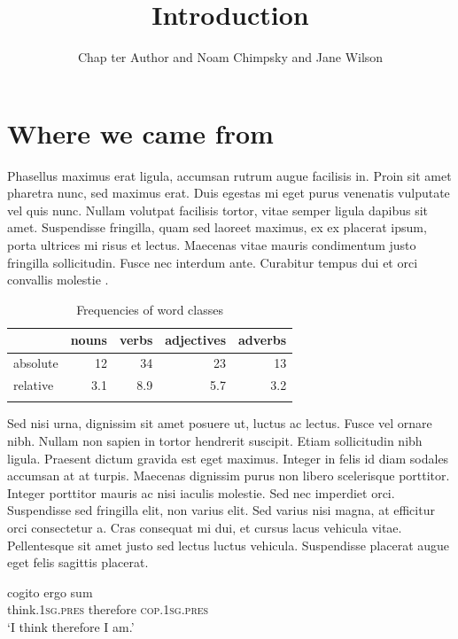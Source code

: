 \documentclass[output=paper,colorlinks,citecolor=brown
]{langscibook}
\author{Chap ter Author\orcid{}\affiliation{University of Eden} and
        Noam Chimpsky\orcid{}\affiliation{University of Pluto} and
        Jane Wilson\orcid{}\affiliation{National Institute for Language}}
\title{Introduction}
\begin{document}
\maketitle

\section{Where we came from}
Phasellus maximus erat ligula, accumsan rutrum augue facilisis in. Proin sit amet pharetra nunc, sed maximus erat. Duis egestas mi eget purus venenatis vulputate vel quis nunc. Nullam volutpat facilisis tortor, vitae semper ligula dapibus sit amet. Suspendisse fringilla, quam sed laoreet maximus, ex ex placerat ipsum, porta ultrices mi risus et lectus. Maecenas vitae mauris condimentum justo fringilla sollicitudin. Fusce nec interdum ante. Curabitur tempus dui et orci convallis molestie \citep{Chomsky1957}.

\begin{table}
\caption{Frequencies of word classes}
\label{tab:myname:frequencies}
 \begin{tabularx}{.8\textwidth}{X rrrr}
  \lsptoprule
            & nouns & verbs  & adjectives & adverbs\\
  \midrule
  absolute  &   12  &    34  &    23      & 13\\
  relative  &   3.1 &   8.9  &    5.7     & 3.2\\
  \lspbottomrule
 \end{tabularx}
\end{table}

Sed nisi urna, dignissim sit amet posuere ut, luctus ac lectus. Fusce vel ornare nibh. Nullam non sapien in tortor hendrerit suscipit. Etiam sollicitudin nibh ligula. Praesent dictum gravida est eget maximus. Integer in felis id diam sodales accumsan at at turpis. Maecenas dignissim purus non libero scelerisque porttitor. Integer porttitor mauris ac nisi iaculis molestie. Sed nec imperdiet orci. Suspendisse sed fringilla elit, non varius elit. Sed varius nisi magna, at efficitur orci consectetur a. Cras consequat mi dui, et cursus lacus vehicula vitae. Pellentesque sit amet justo sed lectus luctus vehicula. Suspendisse placerat augue eget felis sagittis placerat.


\ea
\gll cogito                           ergo      sum\\
     think.\textsc{1sg}.\textsc{pres} therefore \textsc{cop}.\textsc{1sg}.\textsc{pres}\\
\glt `I think therefore I am.'
\z
{} %
\end{document}
